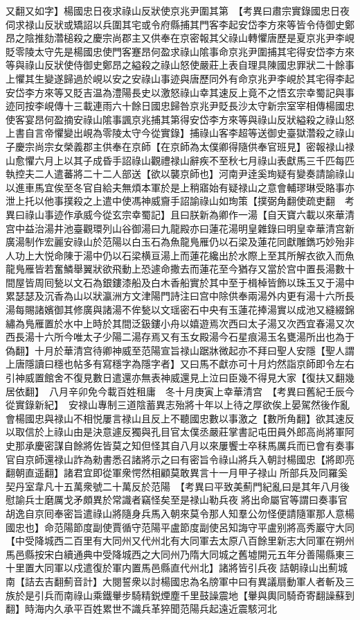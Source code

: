 又翻又如字】楊國忠日夜求祿山反狀使京兆尹圍其第　【考異曰肅宗實錄國忠日夜伺求禄山反狀或矯詔以兵圍其宅或令府縣捕其門客李起安岱李方來等皆令侍御史鄭昂之陰推劾濳槌殺之慶宗尚郡主又供奉在京密報其父祿山轉懼唐歷是夏京兆尹李峴貶零陵太守先是楊國忠使門客蹇昂何盈求祿山隂事命京兆尹圍捕其宅得安岱李方來等與祿山反狀使侍御史鄭昂之縊殺之祿山怒使嚴莊上表自理具陳國忠罪狀二十餘事上懼其生變遂歸過於峴以安之安祿山事迹與唐歷同外有命京兆尹李峴於其宅得李起安岱李方來等又貶吉温為澧陽長史以激怒祿山幸其速反上竟不之悟玄宗幸蜀記與事迹同按李峴傳十三載連雨六十餘日國忠歸咎京兆尹貶長沙太守新宗室宰相傳楊國忠使客宴昂何盈摘安祿山隂事諷京兆捕其第得安岱李方來等與祿山反狀縊殺之祿山怒上書自言帝懼變出峴為零陵太守今從實錄】捕祿山客李超等送御史臺獄濳殺之祿山子慶宗尚宗女榮義郡主供奉在京師【在京師為太僕卿得隨供奉官班見】密報禄山禄山愈懼六月上以其子成昏手詔祿山觀禮禄山辭疾不至秋七月祿山表獻馬三千匹每匹執控夫二人遣蕃將二十二人部送【欲以襲京師也】河南尹逹奚珣疑有變奏請諭祿山以進車馬宜俟至冬官自給夫無煩本軍於是上稍寤始有疑禄山之意會輔璆琳受賂事亦泄上托以他事撲殺之上遣中使馮神威齎手詔諭祿山如珣策【撲弼角翻使疏吏翻　考異曰祿山事迹作承威今從玄宗幸蜀記】且曰朕新為卿作一湯【自天寶六載以來華清宫中益治湯井池臺觀環列山谷御湯曰九龍殿亦曰蓮花湯明皇雜錄曰明皇幸華清宫新廣湯制作宏麗安祿山於范陽以白玉石為魚龍鳬雁仍以石梁及蓮花同獻雕鐫巧妙殆非人功上大悦命陳于湯中仍以石梁横亘湯上而蓮花纔出於水際上至其所解衣欲入而魚龍鳬雁皆若奮鱗舉翼狀欲飛動上恐遽命撒去而蓮花至今猶存又當於宫中置長湯數十間屋皆周囘甃以文石為銀鏤漆船及白木香船實於其中至于楫棹皆飾以珠玉又于湯中累瑟瑟及沉香為山以狀瀛洲方文津陽門詩注曰宫中除供奉兩湯外内更有湯十六所長湯每賜諸嬪御其修廣與諸湯不侔甃以文瑶密石中央有玉蓮花捧湯實以成池又縫綴錦繡為鳬雁置於水中上時於其間泛鈒鏤小舟以嬉遊焉次西曰太子湯又次西宜春湯又次西長湯十六所今唯太子少陽二湯存焉又有玉女殿湯今石星痕湯玉名甕湯所出也為于偽翻】十月於華清宫待卿神威至范陽宣旨禄山踞牀微起亦不拜曰聖人安隱【聖人謂上唐隱讀曰穩也帖多有寫穩字為隱字者】又曰馬不獻亦可十月灼然詣京師即令左右引神威置館舍不復見數日遣還亦無表神威還見上泣曰臣幾不得見大家【復扶又翻幾居依翻】　八月辛卯免今載百姓租庸　冬十月庚寅上幸華清宫　【考異曰舊紀壬辰今從實錄新紀】　安禄山專制三道陰蓄異志殆將十年以上待之厚欲俟上晏駕然後作亂會楊國忠與禄山不相悦屢言禄山且反上不聽國忠數以事激之【數所角翻】欲其速反以取信於上祿山由是決意遽反獨與孔目官太僕丞嚴莊掌書記屯田員外郎高尚將軍阿史那承慶密謀自餘將佐皆莫之知但怪其自八月以來屢饗士卒秣馬厲兵而已會有奏事官自京師還禄山詐為勑書悉召諸將示之曰有密旨令祿山將兵入朝討楊國忠【將即亮翻朝直遥翻】諸君宜即從軍衆愕然相顧莫敢異言十一月甲子禄山所部兵及同羅奚契丹室韋凡十五萬衆號二十萬反於范陽　【考異曰平致美薊門紀亂曰是其年八月後慰諭兵士磨厲戈矛頗異於常識者竊怪矣至是禄山勒兵夜將出命屬官等謂曰奏事官胡逸自京囘奉密旨遣祿山將隨身兵馬入朝來莫令那人知羣公勿怪便請隨軍那人意楊國忠也】命范陽節度副使賈循守范陽平盧節度副使呂知誨守平盧别將高秀巖守大同【中受降城西二百里有大同州又代州北有大同軍去太原八百餘里新志大同軍在朔州馬邑縣按宋白續通典中受降城西之大同州乃隋大同城之舊墟開元五年分善陽縣東三十里置大同軍以戍遣復於軍内置馬邑縣直代州北】諸將皆引兵夜詰朝祿山出薊城南【詰去吉翻薊音計】大閱誓衆以討楊國忠為名牓軍中曰有異議扇動軍人者斬及三族於是引兵而南祿山乘鐵轝步騎精鋭煙塵千里鼓譟震地【轝與輿同騎奇寄翻譟蘇到翻】時海内久承平百姓累世不識兵革猝聞范陽兵起遠近震駭河北